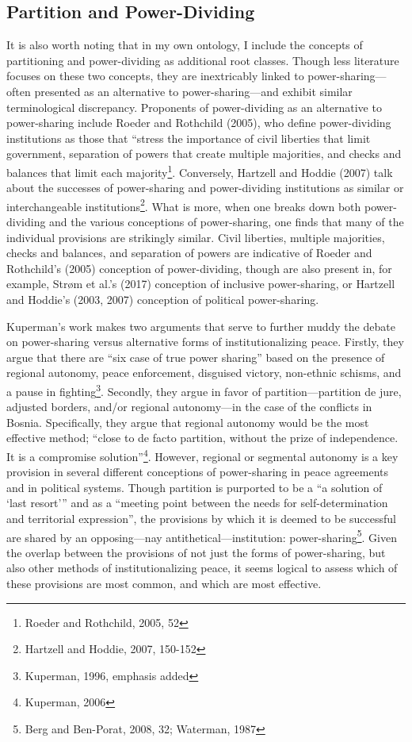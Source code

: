 \documentclass[12pt]{article}
\begin{document}
\subsection{Partition and Power-Dividing}
It is also worth noting that in my own ontology, I include the concepts of partitioning and power-dividing as additional root classes. Though less literature focuses on these two concepts, they are inextricably linked to power-sharing—often presented as an alternative to power-sharing—and exhibit similar terminological discrepancy. Proponents of power-dividing as an alternative to power-sharing include Roeder and Rothchild (2005), who define power-dividing institutions as those that “stress the importance of civil liberties that limit government, separation of powers that create multiple majorities, and checks and balances that limit each majority\footnote{Roeder and Rothchild, 2005, 52}. Conversely, Hartzell and Hoddie (2007) talk about the successes of power-sharing and power-dividing institutions as similar or interchangeable institutions\footnote{Hartzell and Hoddie, 2007, 150-152}. What is more, when one breaks down both power-dividing and the various conceptions of power-sharing, one finds that many of the individual provisions are strikingly similar. Civil liberties, multiple majorities, checks and balances, and separation of powers are indicative of Roeder and Rothchild’s (2005) conception of power-dividing, though are also present in, for example, Strøm et al.’s (2017) conception of inclusive power-sharing, or Hartzell and Hoddie’s (2003, 2007) conception of political power-sharing. 

Kuperman’s work makes two arguments that serve to further muddy the debate on power-sharing versus alternative forms of institutionalizing peace. Firstly, they argue that there are “six case of true power sharing” based on the presence of regional autonomy, peace enforcement, disguised victory, non-ethnic schisms, and a pause in fighting\footnote{Kuperman, 1996, emphasis added}. Secondly, they argue in favor of partition—partition de jure, adjusted borders, and/or regional autonomy—in the case of the conflicts in Bosnia. Specifically, they argue that regional autonomy would be the most effective method; “close to de facto partition, without the prize of independence. It is a compromise solution”\footnote{Kuperman, 2006}. However, regional or segmental autonomy is a key provision in several different conceptions of power-sharing in peace agreements and in political systems. Though partition is purported to be a “a solution of ‘last resort’” and as a “meeting point between the needs for self-determination and territorial expression”, the provisions by which it is deemed to be successful are shared by an opposing—nay antithetical—institution: power-sharing\footnote{Berg and Ben-Porat, 2008, 32; Waterman, 1987}. Given the overlap between the provisions of not just the forms of power-sharing, but also other methods of institutionalizing peace, it seems logical to assess which of these provisions are most common, and which are most effective. 
\end{document}
